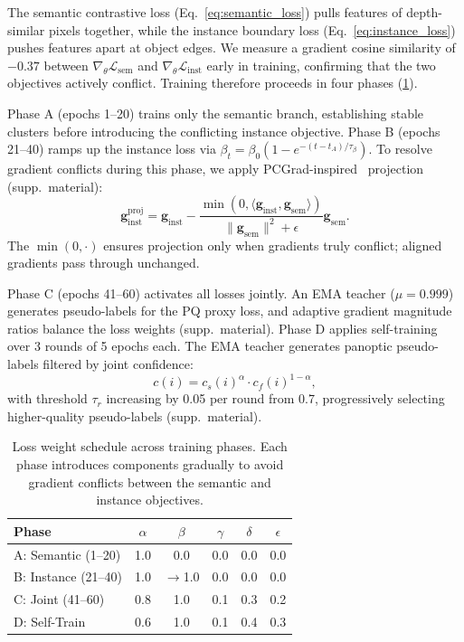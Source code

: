 \documentclass[10pt,twocolumn,letterpaper]{article}
\newcommand{\lsem}{\mathcal{L}_{\text{sem}}}
\newcommand{\linst}{\mathcal{L}_{\text{inst}}}
\begin{document}
The semantic contrastive loss (Eq.~\ref{eq:semantic_loss}) pulls features of depth-similar pixels together, while the instance boundary loss (Eq.~\ref{eq:instance_loss}) pushes features apart at object edges. We measure a gradient cosine similarity of $-0.37$ between $\nabla_\theta \lsem$ and $\nabla_\theta \linst$ early in training, confirming that the two objectives actively conflict. Training therefore proceeds in four phases (\cref{tab:curriculum}).

Phase A (epochs 1--20) trains only the semantic branch, establishing stable clusters before introducing the conflicting instance objective. Phase B (epochs 21--40) ramps up the instance loss via $\beta_t = \beta_0(1 - e^{-(t-t_A)/\tau_\beta})$. To resolve gradient conflicts during this phase, we apply PCGrad-inspired~\cite{yu2020pcgrad} projection (supp.\ material):
\begin{equation}
\mathbf{g}_{\text{inst}}^{\text{proj}} = \mathbf{g}_{\text{inst}} - \frac{\min(0, \langle \mathbf{g}_{\text{inst}}, \mathbf{g}_{\text{sem}} \rangle)}{\|\mathbf{g}_{\text{sem}}\|^2 + \epsilon} \mathbf{g}_{\text{sem}}.
\label{eq:grad_proj}
\end{equation}
The $\min(0, \cdot)$ ensures projection only when gradients truly conflict; aligned gradients pass through unchanged.

Phase C (epochs 41--60) activates all losses jointly. An EMA teacher ($\mu{=}0.999$) generates pseudo-labels for the PQ proxy loss, and adaptive gradient magnitude ratios balance the loss weights (supp.\ material). Phase D applies self-training over 3 rounds of 5 epochs each. The EMA teacher generates panoptic pseudo-labels filtered by joint confidence:
\begin{equation}
c(i) = c_s(i)^\alpha \cdot c_f(i)^{1-\alpha},
\label{eq:confidence}
\end{equation}
with threshold $\tau_r$ increasing by 0.05 per round from 0.7, progressively selecting higher-quality pseudo-labels (supp.\ material).

\begin{table}[t]
\centering
\caption{Loss weight schedule across training phases. Each phase introduces components gradually to avoid gradient conflicts between the semantic and instance objectives.}
\label{tab:curriculum}
\setlength{\tabcolsep}{3pt}
\begin{tabular}{lccccc}
\toprule
Phase & $\alpha$ & $\beta$ & $\gamma$ & $\delta$ & $\epsilon$ \\
\midrule
A: Semantic (1--20) & 1.0 & 0.0 & 0.0 & 0.0 & 0.0 \\
B: Instance (21--40) & 1.0 & $\to$1.0 & 0.0 & 0.0 & 0.0 \\
C: Joint (41--60) & 0.8 & 1.0 & 0.1 & 0.3 & 0.2 \\
D: Self-Train & 0.6 & 1.0 & 0.1 & 0.4 & 0.3 \\
\bottomrule
\end{tabular}
\end{table}
\end{document}
